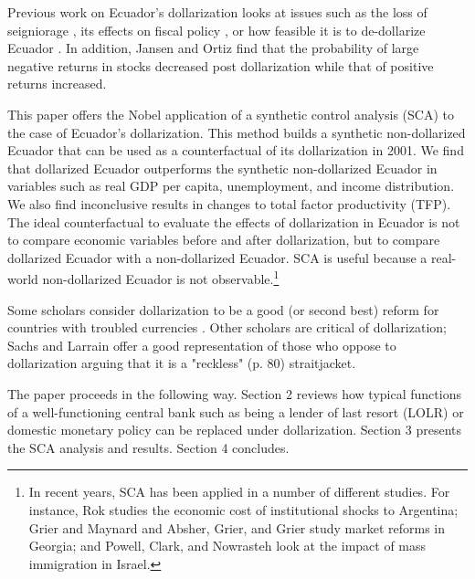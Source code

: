 \documentclass[12pt]{article}
\begin{document}
Previous work on Ecuador's dollarization looks at issues such as the loss of seigniorage \parencite{Lange2005}, its effects on fiscal policy \parencite{MariDelCristo2016}, or how feasible it is to de-dollarize Ecuador \parencite{JAMESON2003}. In addition, Jansen and Ortiz \parencite*{Jansen2007} find that the probability of large negative returns in stocks decreased post dollarization while that of positive returns increased.

This paper offers the Nobel application of a synthetic control analysis (SCA) \parencite{Abadie,Abadie2003,Abadie2015} to the case of Ecuador's dollarization. This method builds a synthetic non-dollarized Ecuador that can be used as a counterfactual of its dollarization in 2001. We find that dollarized Ecuador outperforms the synthetic non-dollarized Ecuador in variables such as real GDP per capita, unemployment, and income distribution. We also find inconclusive results in changes to total factor productivity (TFP). The ideal counterfactual to evaluate the effects of dollarization in Ecuador is not to compare economic variables before and after dollarization, but to compare dollarized Ecuador with a non-dollarized Ecuador. SCA is useful because a real-world non-dollarized Ecuador is not observable.\footnote{In recent years, SCA has been applied in a number of different studies. For instance, Rok \parencite*{Spruk2019} studies the economic cost of institutional shocks to Argentina; Grier and Maynard \parencite*{Grier2016} and Absher, Grier, and Grier \parencite*{Absher2020} study market reforms in Georgia; and Powell, Clark, and Nowrasteh \parencite*{Powell2017} look at the impact of mass immigration in Israel.}

Some scholars consider dollarization to be a good (or second best) reform for countries with troubled currencies \parencite{Avila2019,Cochrane2018,Gale2002,Hanke2003a,White2014a}. Other scholars are critical of dollarization; Sachs and Larrain \parencite*{Sachs1999} offer a good representation of those who oppose to dollarization arguing that it is a "reckless" (p. 80) straitjacket. 

The paper proceeds in the following way. Section 2 reviews how typical functions of a well-functioning central bank such as being a lender of last resort (LOLR) or domestic monetary policy can be replaced under dollarization. Section 3 presents the SCA analysis and results. Section 4 concludes.


\end{document}
